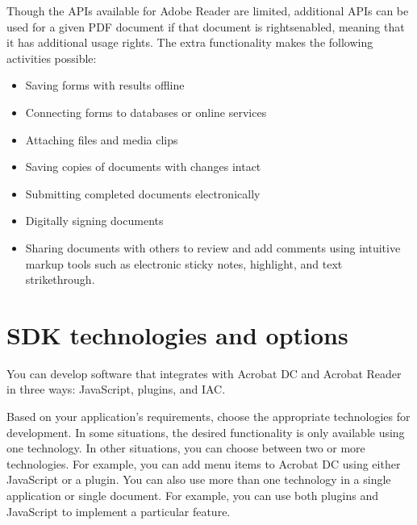 \documentclass[letterpaper,12pt,english,openany,oneside]{sphinxmanual}
\begin{document}
Though the APIs available for Adobe Reader are limited, additional APIs can be used for a given PDF document if that document is rights\sphinxhyphen{}enabled, meaning that it has additional usage rights. The extra functionality makes the following activities possible:
\begin{itemize}
\item {} 
Saving forms with results offline

\item {} 
Connecting forms to databases or online services

\item {} 
Attaching files and media clips

\item {} 
Saving copies of documents with changes intact

\item {} 
Submitting completed documents electronically

\item {} 
Digitally signing documents

\item {} 
Sharing documents with others to review and add comments using intuitive markup tools such as electronic sticky notes, highlight, and text strikethrough.

\end{itemize}


\section{SDK technologies and options}
\label{\detokenize{index:sdk-technologies-and-options}}
You can develop software that integrates with Acrobat DC and Acrobat Reader in three ways: JavaScript, plug\sphinxhyphen{}ins, and IAC.

Based on your application’s requirements, choose the appropriate technologies for development. In some situations, the desired functionality is only available using one technology. In other situations, you can choose between two or more technologies. For example, you can add menu items to Acrobat DC using either JavaScript or a plug\sphinxhyphen{}in. You can also use more than one technology in a single application or single document. For example, you can use both plug\sphinxhyphen{}ins and JavaScript to implement a particular feature.
\end{document}
